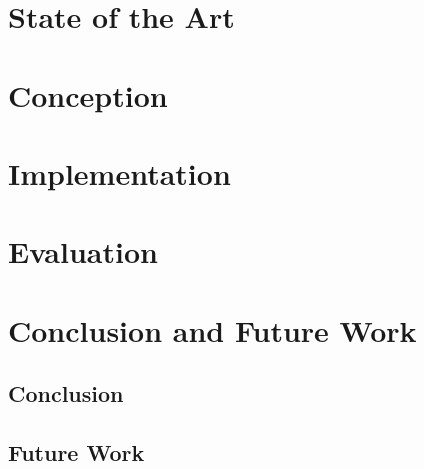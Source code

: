 \documentclass[english, BCOR=6mm, twoside=true, open=right]{tudscrreprt}
\begin{document}
\chapter{State of the Art}\label{chapter:state-of-the-art}



\chapter{Conception}




\chapter{Implementation}



\chapter{Evaluation}



\chapter{Conclusion and Future Work}
\section{Conclusion}
\section{Future Work}


\newpage
{}
\listoffigures

\newpage
{}
\listoftables

\newpage
{}
\lstlistoflistings

\newpage
{}
\printglossary
\end{document}
